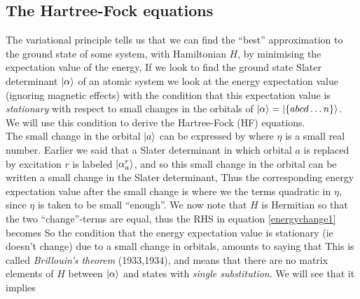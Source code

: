 \subsection{The Hartree-Fock equations}
\newcommand{\hHF}{h_{\text{HF}}}
\newcommand{\uHF}{u_{\text{HF}}}
\newcommand{\occs}{\text{occ}}
The variational principle tells us that we can find the ``best'' approximation to the ground state of some system, with Hamiltonian $H$, by minimising the expectation value of the
energy,
If we look to find the ground state Slater determinant $\ket{\alpha}$ of an atomic system we look at the energy expectation value (ignoring magnetic effects)
with the condition that this expectation value is \emph{stationary} with respect to small changes in the orbitals of $\ket{\alpha} = \ket{\{abcd\dots n\}}$. We will use this condition to derive the Hartree-Fock (HF) equations.\\
\indent The small change in the orbital $\ket{a}$ can be expressed by
where $\eta$ is a small real number. Earlier we said that a Slater determinant in which orbital $a$ is replaced by excitation $r$ is labeled $\ket{\alpha_a^r}$, and so this small change in the orbital can be written a small change in the Slater determinant,
Thus the corresponding energy expectation value after the small change is
where we the terms quadratic in $\eta$, since $\eta$ is taken to be small ``enough''. We now note that $H$ is Hermitian so that the two ``change''-terms are equal, thus the RHS in equation \eqref{energychange1} becomes
So the condition that the energy expectation value is stationary (ie doesn't change) due to a small change in orbitals, amounts to saying that
This is called \emph{Brillouin's theorem} (1933,1934), and means that there are no matrix elements of $H$ between $\ket{\alpha}$ and states with \emph{single substitution}. We will see that it implies
